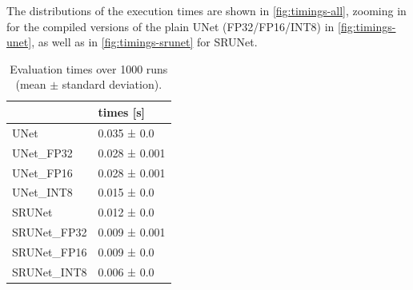 The distributions of the execution times are shown in \cref{fig:timings-all}, zooming in for the compiled versions of the plain UNet (FP32/FP16/INT8) in \cref{fig:timings-unet}, as well as in \cref{fig:timings-srunet} for SRUNet.

\begin{table}[t]
\begin{tabular}{ll}
\toprule
{} &      times [s] \\
\midrule
UNet        &    0.035 ± 0.0 \\
UNet\_FP32   &  0.028 ± 0.001 \\
UNet\_FP16   &  0.028 ± 0.001 \\
UNet\_INT8   &    0.015 ± 0.0 \\
SRUNet      &    0.012 ± 0.0 \\
SRUNet\_FP32 &  0.009 ± 0.001 \\
SRUNet\_FP16 &    0.009 ± 0.0 \\
SRUNet\_INT8 &    0.006 ± 0.0 \\
\bottomrule
\end{tabular}
\caption{Evaluation times over 1000 runs (mean $\pm$ standard deviation).}
\label{tab:timings}
\end{table}

